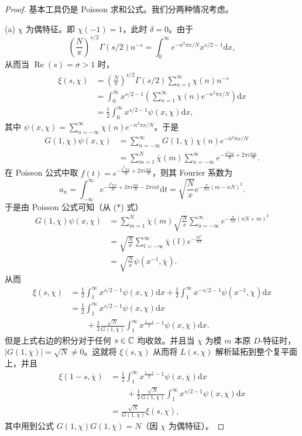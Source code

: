 \begin{proof}
基本工具仍是 Poisson 求和公式。我们分两种情况考虑。

(a) $\chi$ 为偶特征。即 $\chi(-1)=1$，此时 $\delta=0$。由于
\[
  \left(\frac{N}{\pi}\right)^{s/2}\Gamma(s/2)n^{-s}=\int_0^{\infty}e^{-n^2\pi x/N}x^{s/2-1}\mathrm{d}x,
\]
从而当 $\operatorname{Re}(s)=\sigma>1$ 时，
\begin{align*}
  \xi(s,\chi)&=\left(\frac{N}{\pi}\right)^{s/2}\Gamma(s/2)\sum_{n=1}^{\infty}\chi(n)n^{-s}\\
  &=\int_0^{\infty}x^{s/2-1}\left(\sum_{n=1}^{\infty}\chi(n)e^{-n^2\pi x/N}\right)\mathrm{d}x\\
  &=\frac{1}{2}\int_0^{\infty}x^{s/2-1}\psi(x,\chi)\mathrm{d}x,
\end{align*}
其中 $\psi(x,\chi)=\sum_{n=-\infty}^{\infty}\chi(n)e^{-n^2\pi x/N}$。于是
\begin{align*}
  G(1,\overline{\chi})\psi(x,\chi)
  &=\sum_{n=-\infty}^{\infty}G(1,\overline{\chi})\chi(n)e^{-n^2\pi x/N}\\
  &=\sum_{m=1}^{N}\overline{\chi}(m)\sum_{n=-\infty}^{\infty}e^{-\frac{n^2\pi x}{N}+2\pi i\frac{mn}{N}}.\tag{*}
\end{align*}
在 Poisson 公式中取 $f(t)=e^{-\frac{t^2\pi x}{N}+2\pi i\frac{mt}{N}}$，则其 Fourier 系数为
\[
  a_n=\int_{-\infty}^{\infty}e^{-\frac{t^2\pi x}{N}+2\pi i\frac{mt}{N}-2\pi int}\mathrm{d}t
  =\sqrt{\frac{N}{x}}e^{-\frac{\pi}{Nx}(m-nN)^2}.
\]
于是由 Poisson 公式可知（从 (*) 式）
\begin{align*}
  G(1,\overline{\chi})\psi(x,\chi)
  &=\sum_{m=1}^{N}\overline{\chi}(m)\sqrt{\frac{N}{x}}\sum_{n=-\infty}^{\infty}e^{-\frac{\pi}{Nx}(nN+m)^2}\\
  &=\sqrt{\frac{N}{x}}\sum_{l=-\infty}^{\infty}\overline{\chi}(l)e^{-\frac{\pi l^2}{Nx}}\\
  &=\sqrt{\frac{N}{x}}\psi(x^{-1},\overline{\chi}).
\end{align*}
从而
\begin{align*}
  \xi(s,\chi)&=\frac{1}{2}\int_1^{\infty}x^{s/2-1}\psi(x,\chi)\mathrm{d}x+\frac{1}{2}\int_1^{\infty}x^{-s/2-1}\psi(x^{-1},\chi)\mathrm{d}x\\
  &=\frac{1}{2}\int_1^{\infty}x^{s/2-1}\psi(x,\chi)\mathrm{d}x\\
  &\qquad+\frac{1}{2}\frac{\sqrt{N}}{G(1,\overline{\chi})}\int_1^{\infty}x^{\frac{1-s}{2}-1}\psi(x,\overline{\chi})\mathrm{d}x.
\end{align*}
但是上式右边的积分对于任何 $s\in\mathbb{C}$ 均收敛。并且当 $\chi$ 为模 $m$ 本原 $D$-特征时，$|G(1,\overline{\chi})|=\sqrt{N}\neq 0$。这就将 $\xi(s,\chi)$ 从而将 $L(s,\chi)$ 解析延拓到整个复平面上，并且
\begin{align*}
  \xi(1-s,\overline{\chi})&=\frac{1}{2}\int_1^{\infty}x^{\frac{1-s}{2}-1}\psi(x,\overline{\chi})\mathrm{d}x\\
  &\qquad+\frac{1}{2}\frac{\sqrt{N}}{G(1,\chi)}\int_1^{\infty}x^{s/2-1}\psi(x,\chi)\mathrm{d}x\\
  &=\frac{\sqrt{N}}{G(1,\chi)}\xi(s,\chi),
\end{align*}
其中用到公式 $G(1,\chi)G(1,\overline{\chi})=N$（因 $\chi$ 为偶特征）。


\end{proof}

